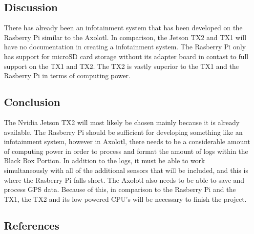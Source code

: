 \documentclass[onecolumn, draftclsnofoot,10pt, compsoc]{IEEEtran}
\begin{document}
\subsection{Discussion}
There has already been an infotainment system that has been developed on the Rasberry Pi similar to the Axolotl. In comparison, the Jetson TX2 and TX1 will have no documentation in creating a infotainment system. 
The Rasberry Pi only has support for microSD card storage without its adapter board in contast to full support on the TX1 and TX2. 
The TX2 is vastly superior to the TX1 and the Rasberry Pi in terms of computing power. 

\subsection{Conclusion}
The Nvidia Jetson TX2 will most likely be chosen mainly because it is already available. The Rasberry Pi should be sufficient for developing something like an infotainment system, however in Axolotl, there needs to be a considerable amount of computing power in order to process and format the amount of logs within the Black Box Portion. In addition to the logs, it must be able to work simultaneously with all of the additional sensors that will be included, and this is where the Rasberry Pi falls short. The Axolotl also needs to be able to save and process GPS data. Because of this, in comparison to the Rasberry Pi and the TX1, the TX2 and its low powered CPU's will be necessary to finish the project.

\clearpage
\subsection{References}


\end{document}
